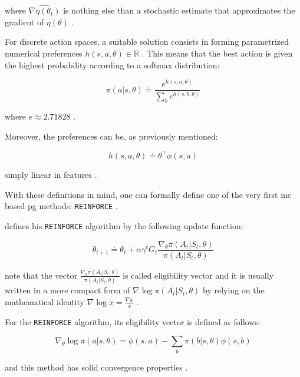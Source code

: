 where $ \widehat{\nabla \eta (\theta_t)}$ is nothing else than a stochastic estimate that approximates the gradient of $\eta(\theta)$ \citep[p. 265]{Sutton2017}.

For discrete action spaces, a suitable solution consists in forming parametrized numerical preferences $h(s,a,\theta) \in \mathbb{R}$ \citep[p. 266]{Sutton2017}. This means that the best action is given the highest probability according to a softmax distribution:

\begin{equation}
\label{eq:probabilistic_preferences}
	\pi(a|s,\theta) \doteq \frac{e^{h(s,a,\theta)}}{\sum_b e^{h(s,b,\theta)}}
\end{equation}

where $e \approx 2.71828$ \citep[p. 266]{Sutton2017}.

Moreover, the preferences can be, as previously mentioned:

\begin{equation}
\label{eq:dot_preferences}
	h(s,a,\theta) \doteq \theta^\top \phi (s,a)
\end{equation}

simply linear in features \citep[p. 266]{Sutton2017}.

With these definitions in mind, one can formally define one of the very first \gls{mc} based \gls{pg} methods: \texttt{REINFORCE} \citep{Williams1992}.

\citet{Williams1992} defines his \texttt{REINFORCE} algorithm by the following update function:

\begin{equation}
	\theta_{t+1} \doteq \theta_t + \alpha \gamma^t G_t \frac{\nabla_\theta \pi(A_t|S_t,\theta)}{\pi(A_t|S_t,\theta)}
\end{equation}

note that the vector $\frac{\nabla_\theta \pi(A_t|S_t,\theta)}{\pi(A_t|S_t,\theta)}$ is called eligibility vector and it is usually written in a more compact form of $\nabla \log \pi(A_t|S_t,\theta)$ by relying on the mathematical identity $\nabla \log x = \frac{\nabla x}{x}$ \citep[p. 271]{Sutton2017}.

For the \texttt{REINFORCE} algorithm, its eligibility vector is defined as follows:

\begin{equation}
	\nabla_\theta \log \pi (a|s,\theta) = \phi (s,a) - \sum_b \pi (b|s,\theta) \phi (s,b)
\end{equation}

and this method has solid convergence properties \citep[p. 271]{Sutton2017}.

